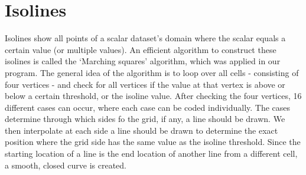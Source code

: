 \section{Isolines}
\label{sec:isolines}
Isolines show all points of a scalar dataset's domain where the scalar equals a certain value (or multiple values).
An efficient algorithm to construct these isolines is called the `Marching squares' algorithm, which was applied in our program.
The general idea of the algorithm is to loop over all cells - consisting of four vertices - and check for all vertices if the value at that vertex is above or below a certain threshold, or the isoline value.
After checking the four vertices, 16 different cases can occur, where each case can be coded individually.
The cases determine through which sides fo the grid, if any, a line should be drawn. We then interpolate at each side a line should be drawn to determine the exact position where the grid side has the same value as the isoline threshold.
Since the starting location of a line is the end location of another line from a different cell, a smooth, closed curve is created.